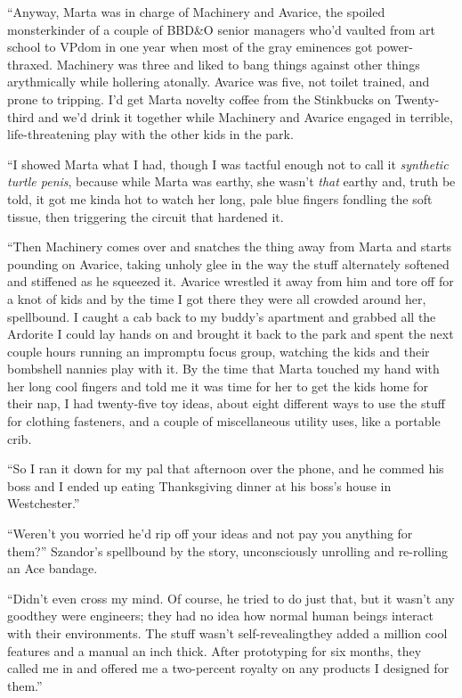 “Anyway, Marta was in charge of Machinery and Avarice, the spoiled
monsterkinder of a couple of BBD\&O senior managers who’d vaulted
from art school to VPdom in one year when most of the gray
eminences got power-thraxed. Machinery was three and liked to bang
things against other things arythmically while hollering atonally.
Avarice was five, not toilet trained, and prone to tripping. I’d
get Marta novelty coffee from the Stinkbucks on Twenty-third and
we’d drink it together while Machinery and Avarice engaged in
terrible, life-threatening play with the other kids in the park.

“I showed Marta what I had, though I was tactful enough not to call
it \emph{synthetic turtle penis}, because while Marta was earthy,
she wasn’t \emph{that} earthy and, truth be told, it got me kinda
hot to watch her long, pale blue fingers fondling the soft tissue,
then triggering the circuit that hardened it.

“Then Machinery comes over and snatches the thing away from Marta
and starts pounding on Avarice, taking unholy glee in the way the
stuff alternately softened and stiffened as he squeezed it. Avarice
wrestled it away from him and tore off for a knot of kids and by
the time I got there they were all crowded around her, spellbound.
I caught a cab back to my buddy’s apartment and grabbed all the
Ardorite I could lay hands on and brought it back to the park and
spent the next couple hours running an impromptu focus group,
watching the kids and their bombshell nannies play with it. By the
time that Marta touched my hand with her long cool fingers and told
me it was time for her to get the kids home for their nap, I had
twenty-five toy ideas, about eight different ways to use the stuff
for clothing fasteners, and a couple of miscellaneous utility uses,
like a portable crib.

“So I ran it down for my pal that afternoon over the phone, and he
commed his boss and I ended up eating Thanksgiving dinner at his
boss’s house in Westchester.”

“Weren’t you worried he’d rip off your ideas and not pay you
anything for them?” Szandor’s spellbound by the story,
unconsciously unrolling and re-rolling an Ace bandage.

“Didn’t even cross my mind. Of course, he tried to do just that,
but it wasn’t any good{\dash}they were engineers; they had no idea how
normal human beings interact with their environments. The stuff
wasn’t self-revealing{\dash}they added a million cool features and a
manual an inch thick. After prototyping for six months, they called
me in and offered me a two-percent royalty on any products I
designed for them.”


